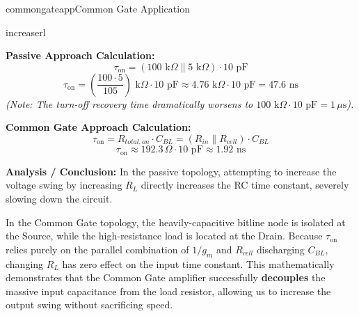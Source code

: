 \begin{mainquestion}{commongateapp}{Common Gate Application}
\begin{partquestion}{increaserl}
\begin{answer}[3in]
    \textbf{Passive Approach Calculation:}
    \[\tau_{\text{on}} = (100\text{ k}\Omega \parallel 5\text{ k}\Omega) \cdot 10\text{ pF}\]
    \[\tau_{\text{on}} = \left(\frac{100 \cdot 5}{105}\right)\text{ k}\Omega \cdot 10\text{ pF} \approx 4.76\text{ k}\Omega \cdot 10\text{ pF} = 47.6\text{ ns}\]
    \textit{(Note: The turn-off recovery time dramatically worsens to $100\text{ k}\Omega \cdot 10\text{ pF} = 1\,\mu\text{s}$).}
    
    \textbf{Common Gate Approach Calculation:}
    \[\tau_{\text{on}} = R_{total,on} \cdot C_{BL} = (R_{in} \parallel R_{cell}) \cdot C_{BL}\]
    \[\tau_{\text{on}} \approx 192.3\,\Omega \cdot 10\text{ pF} \approx 1.92\text{ ns}\]
    
    \textbf{Analysis / Conclusion:} 
    In the passive topology, attempting to increase the voltage swing by increasing $R_L$ directly increases the RC time constant, severely slowing down the circuit. 
    
    In the Common Gate topology, the heavily-capacitive bitline node is isolated at the Source, while the high-resistance load is located at the Drain. Because $\tau_{\text{on}}$ relies purely on the parallel combination of $1/g_m$ and $R_{cell}$ discharging $C_{BL}$, changing $R_L$ has zero effect on the input time constant. This mathematically demonstrates that the Common Gate amplifier successfully \textbf{decouples} the massive input capacitance from the load resistor, allowing us to increase the output swing without sacrificing speed.
\end{answer}

\end{partquestion}

\end{mainquestion}
